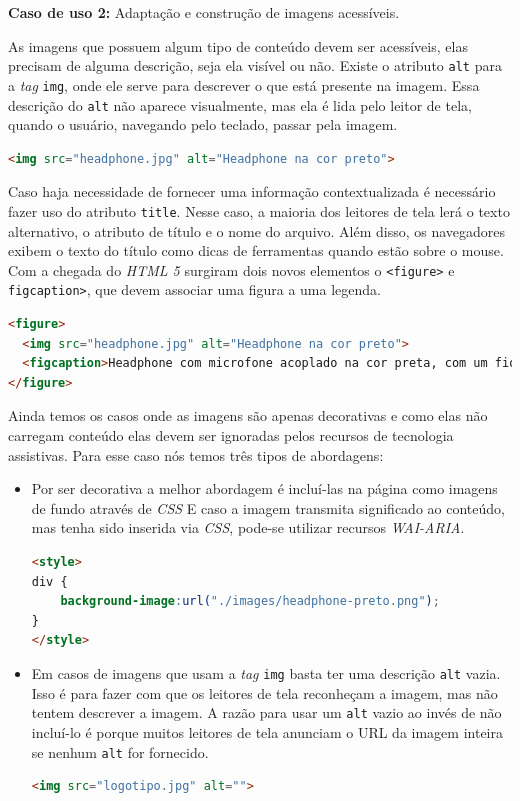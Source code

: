 {\begin{itemize}
\vspace*{50px}
{\textbf{Caso de uso 2:} Adaptação e construção de imagens acessíveis. 
\item As imagens que possuem algum tipo de conteúdo devem ser acessíveis, elas precisam de alguma descrição, seja ela visível ou não. Existe o atributo \lstinline{alt} para a \textit{tag} \lstinline{img}, onde ele serve para descrever o que está presente na imagem. Essa descrição do \lstinline{alt} não aparece visualmente, mas ela é lida pelo leitor de tela, quando o usuário, navegando pelo teclado, passar pela imagem.}
{\begin{lstlisting}[language=html,caption=usando atributo alt]
<img src="headphone.jpg" alt="Headphone na cor preto"> 
\end{lstlisting}}
\item Caso haja necessidade de fornecer uma informação contextualizada é necessário fazer uso do atributo \lstinline{title}. Nesse caso, a maioria dos leitores de tela lerá o texto alternativo, o atributo de título e o nome do arquivo. Além disso, os navegadores exibem o texto do título como dicas de ferramentas quando estão sobre o mouse. Com a chegada do \textit{HTML 5} surgiram dois novos elementos o \lstinline{<figure>} e \lstinline{figcaption>}, que devem associar uma figura a uma legenda. 
{\begin{lstlisting}[language=html,caption=usando atributo alt]
<figure>
  <img src="headphone.jpg" alt="Headphone na cor preto"> 
  <figcaption>Headphone com microfone acoplado na cor preta, com um fio de ótima construção</figcaption>
</figure>
\end{lstlisting}}

\item  Ainda temos os casos onde as imagens são apenas decorativas e como elas não carregam conteúdo elas devem ser ignoradas pelos recursos de tecnologia assistivas. Para esse caso nós temos três tipos de abordagens: 
\begin{itemize}
\item Por ser decorativa a melhor abordagem é incluí-las na página como imagens de fundo através de \textit{CSS} E caso a imagem transmita significado ao conteúdo, mas tenha sido inserida via \textit{CSS}, pode-se utilizar recursos \textit{WAI-ARIA}.
{\begin{lstlisting}[language=html,caption=adicionando imagem via CSS]
<style>
div {
    background-image:url("./images/headphone-preto.png");
}
</style>
\end{lstlisting}}
\item Em casos de imagens que usam a \textit{tag} \lstinline{img} basta ter uma descrição \lstinline{alt} vazia. Isso é para fazer com que os leitores de tela reconheçam a imagem, mas não tentem descrever a imagem. A razão para usar um \lstinline{alt} vazio ao invés de não incluí-lo é porque muitos leitores de tela anunciam o URL da imagem inteira se nenhum \lstinline{alt} for fornecido.
{\begin{lstlisting}[language=html,caption=usando atributo alt vazio]
<img src="logotipo.jpg" alt=""> 
\end{lstlisting}}


\end{itemize}
\end{itemize}}
